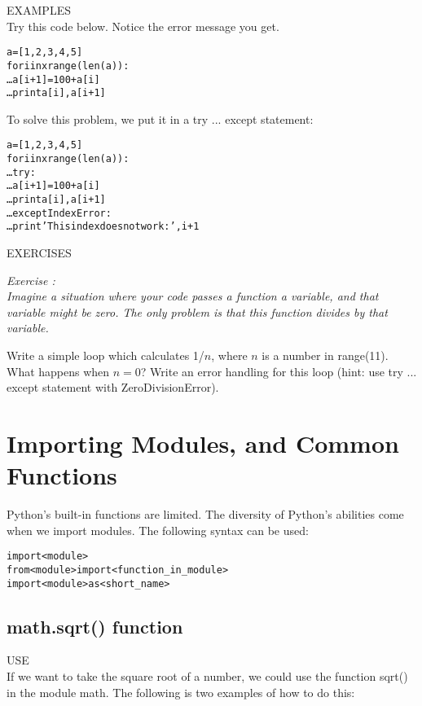 {\color{blue} {\sf\small EXAMPLES}} \\
Try this code below.  Notice the error message you get.
\begin{alltt}
\pytab a = [1, 2, 3, 4, 5]  
\pytab for i in xrange(len(a)): 
\ldots    a[i + 1] = 100 + a[i] 
\ldots    print a[i], a[i + 1] 
\end{alltt}
To solve this problem, we put it in a {\sf\small try ... except}
statement: 
\begin{alltt}
\pytab a = [1, 2, 3, 4, 5] 
\pytab for i in xrange(len(a)): 
\ldots     try:  
\ldots         a[i + 1] = 100 + a[i] 
\ldots         print a[i], a[i + 1] 
\ldots     except IndexError: 
\ldots         print 'This index does not work: ',i + 1
\end{alltt}

{\color{blue} {\sf\small EXERCISES}} \\
{\it Exercise  :  \\
Imagine a situation where your code passes a function a variable,
and that variable might be zero.  The only problem is that this
function divides by that variable.

Write a simple loop which calculates 1/$n$, where $n$ is a number
in range(11).  What happens when $n=0$?  Write an error handling for this loop
(hint: use {\sf\small try ... except} statement with
ZeroDivisionError).}

\section{Importing Modules, and Common Functions}
\label{s:mod}
Python's built-in functions are limited.  The diversity of Python's
abilities come when we import modules.  The following syntax can be
used: 

\begin{alltt}
\pytab import <module>
\pytab from <module> import <function_in_module>
\pytab import <module> as <short_name>
\end{alltt}

\subsection{ {\sf math.sqrt() } function} 
{\color{blue} {\sf\small USE}} \\
If we want to take the square root of a number, we could
use the function {\sf\small sqrt()} in the module {\sf \small math}.  The following is two
examples of how to do this:
  
